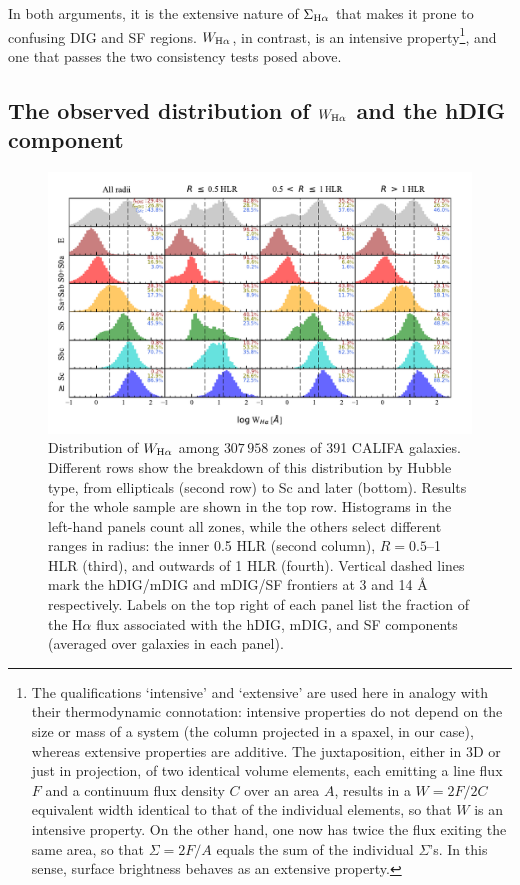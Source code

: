 \documentclass[a4paper, fleqn, usenatbib, useAMS]{mnras}
\newcommand{\Ha}{\ifmmode {\rm H}\alpha \else H$\alpha$\fi\xspace}
\begin{document}
In both arguments, it is the extensive nature of $\Sigma_{\Ha}$ that makes it prone to confusing DIG and SF regions. $W_{\Ha}$, in contrast, is an intensive property\footnote{The qualifications  `intensive' and `extensive' are used here in analogy with their thermodynamic connotation: intensive properties do not depend on the size or mass of a system (the column projected in a spaxel, in our case), whereas extensive properties are additive. The juxtaposition, either in 3D or just in projection, of two identical volume elements, each emitting a line flux $F$ and a continuum flux density $C$ over an area $A$, results in a $W = 2F/2C$ equivalent width identical to that of the individual elements, so that $W$ is an intensive property. On the other hand, one now has twice the flux exiting the same area, so that $\Sigma = 2F/A$ equals the sum of the individual $\Sigma$'s. In this sense, surface brightness behaves as an extensive property.}, and one that passes the two consistency tests posed above.

\subsection{The observed distribution of $W_{\Ha}$ and the hDIG component}
\label{sec:hDIG}

\begin{figure}
\includegraphics{figs/fig_WHa_histograms_per_morftype_and_radius_cumulFHa.pdf}
\caption{Distribution of $W_{\Ha}$ among $307\,958$ zones of 391 CALIFA galaxies. Different rows show the breakdown of this distribution by Hubble type, from ellipticals (second row) to Sc and later (bottom). Results for the whole sample are shown in the top row. Histograms in the left-hand panels count all zones, while the others select different ranges in radius: the inner 0.5 HLR (second column), $R = 0.5$--1 HLR (third), and outwards of 1 HLR (fourth). Vertical dashed lines mark the hDIG/mDIG and mDIG/SF frontiers at 3 and 14 \AA\, respectively. Labels on the top right of each panel list the fraction of the \Ha flux associated with the hDIG, mDIG, and SF components (averaged over galaxies in each panel).
}
 \label{fig:WHaDistrib_ALLgals}
\end{figure}
\end{document}
